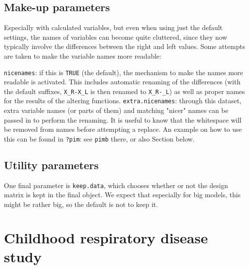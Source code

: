 \documentclass[12pt]{article}
\newcommand{\cd}[1]{\texttt{#1}}%
\begin{document}
\subsection{Make-up parameters}\label{SS_beauty}
Especially with calculated variables, but even when using just the default settings, the names of variables can become quite cluttered, since they now typically involve the differences between the right and left values. Some attempts are taken to make the variable names more readable:

\cd{nicenames}: if this is \cd{TRUE} (the default), the mechanism to make the names more readable is activated. This includes automatic renaming of the differences (with the default suffixes, \cd{X\_R-X\_L} is then renamed to \cd{X\_R-\_L}) as well as proper names for the results of the altering functions.
\cd{extra.nicenames}: through this dataset, extra variable names (or parts of them) and matching "nicer" names can be passed in to perform the renaming. It is useful to know that the whitespace will be removed from names before attempting a replace. An example on how to use this can be found in \cd{?pim}: see \cd{pimb} there, or also Section \label{S_fe} below.
\subsection{Utility parameters}\label{SS_utility}
One final parameter is \cd{keep.data}, which chooses whether or not the design matrix is kept in the final object. We expect that especially for big models, this might be rather big, so the default is not to keep it.
\section{Childhood respiratory disease study}\label{S_crds}
\end{document}
